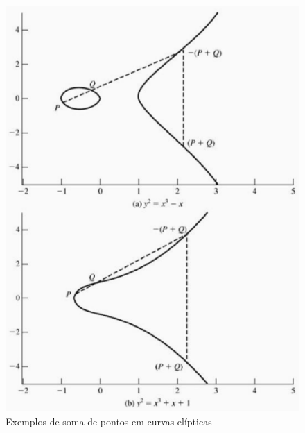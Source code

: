 \begin{figure}[h]
\centering
\includegraphics[scale=0.5, bb=0 0 484 636]{figuras/pontos_curva.eps}
\caption{Exemplos de soma de pontos em curvas elípticas}
\label{fig:pontos}
\end{figure}

